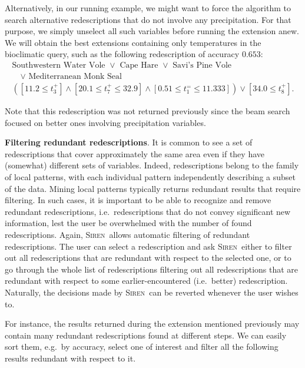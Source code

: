 \documentclass{llncs}
\newcommand{\prg}[1]{\textbf{#1}.}
\newcommand{\Siren}{\textsc{Siren}}
\begin{document}
Alternatively, in our running example, we might want to force the
algorithm to search alternative redescriptions that do not involve any
 precipitation. For that purpose, we simply unselect all such
variables before running the extension anew. We will obtain the best
extensions containing only temperatures in the bioclimatic query, such
as the following redescription of accuracy $0.653$:
\begin{equation*}
\begin{array}{l}
\text{Southwestern Water Vole }\lor\text{ Cape Hare }\lor\text{ Savi's Pine Vole }\\[1mm]
\quad\lor\text{ Mediterranean Monk Seal}\\[3mm]
( [11.2 \leq t_{3}^{+}] \land  [20.1 \leq t_{7}^{+} \leq 32.9] %
\land  [0.51 \leq t_{1}^{=} \leq 11.333]) \lor  [34.0 \leq t_{8}^{+}].
\end{array}
\end{equation*}

Note that this redescription was not returned previously since the
beam search focused on better ones involving precipitation variables.

\prg{Filtering redundant redescriptions}
\label{sec:filt-redund-redescr}
It is common to see a set of redescriptions that cover approximately
the same area even if they have (somewhat) different sets of
variables.  Indeed, redescriptions belong to the family of local
patterns, with each individual pattern independently describing a
subset of the data. Mining local patterns typically returns redundant
results that require filtering.  In such cases, it is important to be
able to recognize and remove redundant redescriptions, i.e.\
redescriptions that do not convey significant new information, lest
the user be overwhelmed with the number of found
redescriptions. Again, \Siren\ allows automatic filtering of redundant
redescriptions. The user can select a redescription and ask
\Siren\ either to filter out all redescriptions that are redundant
with respect to the selected one, or to go through the whole list of
redescriptions filtering out all redescriptions that are redundant
with respect to some earlier-encountered (i.e.\ better)
redescription. Naturally, the decisions made by
\Siren\ can be reverted whenever the user wishes to.

For instance, the results returned during the extension
mentioned previously may contain many redundant redescriptions found
at different steps. We can easily sort them, e.g.\ by accuracy, select
one of interest and filter all the following results redundant with respect to it.
\end{document}
